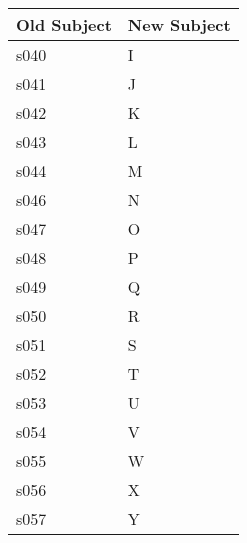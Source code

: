 \documentclass[]{article}
\begin{document}
\begin{table}[!htb]
\begin{minipage}{.33\linewidth}
    \end{minipage} %
  \begin{minipage}{.33\linewidth}
    \centering
      
\begin{tabular}{ll}
\toprule
Old Subject & New Subject\\
\midrule
s040 & I\\
s041 & J\\
s042 & K\\
s043 & L\\
s044 & M\\
s046 & N\\
s047 & O\\
s048 & P\\
s049 & Q\\
s050 & R\\
s051 & S\\
s052 & T\\
s053 & U\\
s054 & V\\
s055 & W\\
s056 & X\\
s057 & Y\\
\bottomrule
\end{tabular}


    \end{minipage} 
\end{table}

\newpage

\subsection{\texorpdfstring{\label{appendix:wilcoxon}}{}}\label{section-2}
\end{document}

